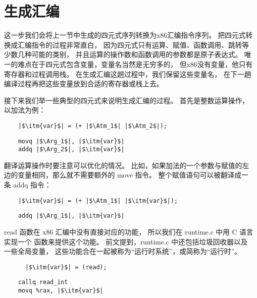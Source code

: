 
\section{生成汇编}
\label{sec:x86}

这一步我们会将上一节中生成的四元式序列转换为x86汇编指令序列。
把四元式转换成汇编指令的过程非常直白，
因为四元式只有运算、赋值、函数调用、跳转等少数几种可能的类别，
并且运算的操作数和函数调用的参数都是原子表达式。
唯一的难点在于四元式包含变量，变量名当然是无穷多的，
但x86没有变量，他只有寄存器和过程调用栈。
在生成汇编这趟过程中，我们保留这些变量名，
在下一趟编译过程再把这些变量放到合适的寄存器或栈上去。

接下来我们举一些典型的四元式来说明生成汇编的过程。
首先是整数运算操作，以加法为例：
\begin{transformation}
\begin{lstlisting}
    |$\itm{var}$| = (+ |$\Atm_1$| |$\Atm_2$|);
\end{lstlisting}
\compilesto
\begin{lstlisting}
    movq |$\Arg_1$|, |$\itm{var}$|
    addq |$\Arg_2$|, |$\itm{var}$|
\end{lstlisting}
\end{transformation}

翻译运算操作时要注意可以优化的情况。
比如，如果加法的一个参数与赋值的左边的变量相同，那么就不需要额外的 move 指令。
整个赋值语句可以被翻译成一条 addq 指令：
\begin{transformation}
\begin{lstlisting}
    |$\itm{var}$| = (+ |$\Atm_1$| |$\itm{var}$|);
\end{lstlisting}
\compilesto
\begin{lstlisting}
    addq |$\Arg_1$|, |$\itm{var}$|
\end{lstlisting}
\end{transformation}

read 函数在 x86 汇编中没有直接对应的功能，
所以我们在 runtime.c 中用 C 语言实现一个  函数来提供这个功能。
前文提到，runtime.c 中还包括垃圾回收器以及一些全局变量，
这些功能合在一起被称为“运行时系统”，或简称为“运行时”。
\begin{transformation}
\begin{lstlisting}
      |$\itm{var}$| = (read);
\end{lstlisting}
\compilesto
\begin{lstlisting}
    callq read_int
    movq %rax, |$\itm{var}$|
\end{lstlisting}
\end{transformation}

